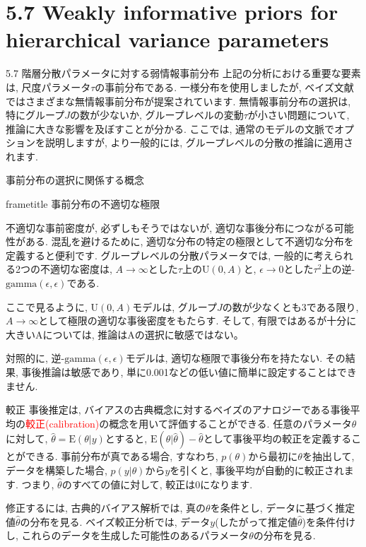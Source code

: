 \documentclass[10pt,dvipdfmx,a4]{beamer}
\newcommand{\dbox}[1]{\begin{beamercolorbox}[wd=122mm, sep=0pt, shadow=false, rounded=false]{frametitle} { #1}\end{beamercolorbox}}
\newcommand{\tcr}[1]{\textcolor{red}{#1}}
\begin{document}
\section{5.7 Weakly informative priors for hierarchical variance parameters}
\begin{frame}{5.7 階層分散パラメータに対する弱情報事前分布}
上記の分析における重要な要素は, 尺度パラメータ$\tau$の事前分布である.
一様分布を使用しましたが, ベイズ文献ではさまざまな無情報事前分布が提案されています.
無情報事前分布の選択は, 特にグループ$J$の数が少ないか, グループレベルの変動$\tau$が小さい問題について, 推論に大きな影響を及ぼすことが分かる.
ここでは, 通常のモデルの文脈でオプションを説明しますが, より一般的には, グループレベルの分散の推論に適用されます.
\end{frame}


\begin{frame}{事前分布の選択に関係する概念}
\dbox{事前分布の不適切な極限}
不適切な事前密度が, 必ずしもそうではないが, 適切な事後分布につながる可能性がある.
混乱を避けるために, 適切な分布の特定の極限として不適切な分布を定義すると便利です.
グループレベルの分散パラメータでは, 一般的に考えられる2つの不適切な密度は, $A\rightarrow \infty$とした$\tau$上の$\text{U}(0, A)$と, $\epsilon\rightarrow 0$とした$\tau^2$上の逆-$\text{gamma}(\epsilon, \epsilon)$である.

ここで見るように, $\text{U}(0,A)$モデルは, グループ$J$の数が少なくとも3である限り, $A\rightarrow\infty$として極限の適切な事後密度をもたらす.
そして, 有限ではあるが十分に大きいAについては, 推論はAの選択に敏感ではない。

対照的に, 逆-$\text{gamma}(\epsilon,\epsilon)$モデルは, 適切な極限で事後分布を持たない.
その結果, 事後推論は敏感であり, 単に0.001などの低い値に簡単に設定することはできません.
\end{frame}


\begin{frame}{較正}
事後推定は, バイアスの古典概念に対するベイズのアナロジーである事後平均の\tcr{較正(calibration)}の概念を用いて評価することができる.
任意のパラメータ$\theta$に対して, $\hat{\theta}=\text{E}(\theta|y)$とすると, $\text{E}(\theta|\hat{\theta})-\hat{\theta}$として事後平均の較正を定義することができる.
事前分布が真である場合, すなわち, $p(\theta)$から最初に$\theta$を抽出して, データを構築した場合, $p(y|\theta)$から$y$を引くと, 事後平均が自動的に較正されます.
つまり, $\hat{\theta}$のすべての値に対して, 較正は0になります.

修正するには,
古典的バイアス解析では, 真の$\theta$を条件とし, データに基づく推定値$\hat{\theta}$の分布を見る.
ベイズ較正分析では, データ$y$(したがって推定値$\hat{\theta}$)を条件付けし, これらのデータを生成した可能性のあるパラメータ$\theta$の分布を見る.
\end{frame}
\end{document}
